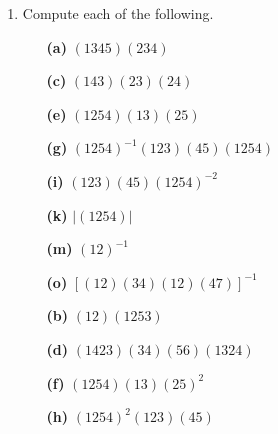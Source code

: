 {\begin{enumerate}
\begin{minipage}[t]{4.6in}
\begin{minipage}[t]{2.25in}
\begin{itemize}
\end{itemize}
\end{minipage}
\end{minipage}
 
\vspace{2pt}        %
 
 
\bf \item \rm  %
Compute each of the following.
 
 
\vspace{3pt}        %
 
\hspace{-7pt}
\begin{minipage}[t]{4.6in}
\noindent
\begin{minipage}[t]{2.25in}
\begin{itemize}
 
 \item[{\bf (a)}]
$(1345)(234)$
 
 \item[{\bf (c)}]
$(143)(23)(24)$
 
 \item[{\bf (e)}]
$(1254)(13)(25)$
 
 \item[{\bf (g)}]
$(1254)^{-1} (123)(45) (1254)$
 
 \item[{\bf (i)}]
$(123)(45) (1254)^{-2}$
 
 \item[{\bf (k)}]
$|(1254)|$
 
 \item[{\bf (m)}]
$(12)^{-1}$
 
 \item[{\bf (o)}]
$[(12)(34)(12)(47)]^{-1}$
 
\end{itemize}
\end{minipage} \hfill
\begin{minipage}[t]{2.25in}
\begin{itemize}
 
 \item[{\bf (b)}]
$(12)(1253)$
 
 \item[{\bf (d)}]
$(1423)(34)(56)(1324)$
 
 \item[{\bf (f)}]
$(1254) (13)(25)^2$
 
 \item[{\bf (h)}]
$(1254)^2 (123)(45)$
 

\end{itemize}
\end{minipage}
\end{minipage}
\end{enumerate}}
